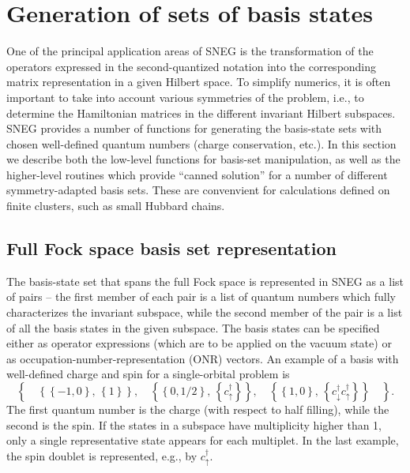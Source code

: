 \documentclass[3p,number,preprint]{elsarticle}
\begin{document}

\section{Generation of sets of basis states}
\label{sec3}

One of the principal application areas of SNEG is the transformation
of the operators expressed in the second-quantized notation into the
corresponding matrix representation in a given Hilbert space. To
simplify numerics, it is often important to take into account various
symmetries of the problem, i.e., to determine the Hamiltonian matrices
in the different invariant Hilbert subspaces. SNEG provides a number
of functions for generating the basis-state sets with chosen
well-defined quantum numbers (charge conservation, etc.). In this
section we describe both the low-level functions for basis-set
manipulation, as well as the higher-level routines which provide
``canned solution'' for a number of different symmetry-adapted basis
sets. These are convenvient for calculations defined on finite
clusters, such as small Hubbard chains.

\subsection{Full Fock space basis set representation}

The basis-state set that spans the full Fock space is represented in
SNEG as a list of pairs -- the first member of each pair is a list of
quantum numbers which fully characterizes the invariant subspace,
while the second member of the pair is a list of all the basis states
in the given subspace. The basis states can be specified either as
operator expressions (which are to be applied on the vacuum state) or
as occupation-number-representation (ONR) vectors. An example of a
basis with well-defined charge and spin for a single-orbital problem
is
%
\begin{equation}
\left\{
\quad
 \left\{
  \left\{ -1,0 \right\},\, \left\{ 1 \right\}
 \right\}, \quad
%
 \left\{ 
  \left\{ 0,1/2 \right\},\, \left\{ c^\dag_\uparrow \right\}
 \right\}, \quad
%
 \left\{ 
  \left\{ 1,0 \right\},\, \left\{ c^\dag_\downarrow c^\dag_\uparrow \right\}
 \right\}
 \quad
\right\}.
\end{equation}
%
The first quantum number is the charge (with respect to half filling),
while the second is the spin. If the states in a subspace have
multiplicity higher than 1, only a single representative state appears
for each multiplet. In the last example, the spin doublet is
represented, e.g., by $c^\dag_\uparrow$.
\end{document}
